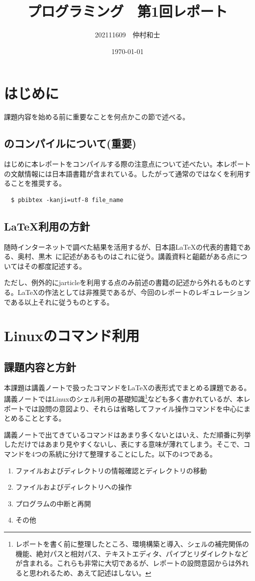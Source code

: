 \documentclass[dvipdfmx,12pt,a4j]{jarticle}
\title{プログラミング　第1回レポート}
\author{202111609　仲村和士}
\date{\today}
\begin{document}
\maketitle
\section{はじめに}
課題内容を始める前に重要なことを何点かこの節で述べる。

\subsection{\BibTeX のコンパイルについて(重要)}
はじめに本レポートをコンパイルする際の注意点について述べたい。本レポートの文献情報には日本語書籍が含まれている。したがって通常の\BibTeX ではなく\pBibTeX を利用することを推奨する。
\begin{verbatim}
  $ pbibtex -kanji=utf-8 file_name
\end{verbatim}

\subsection{\LaTeX 利用の方針}
随時インターネットで調べた結果を活用するが、日本語\LaTeX の代表的書籍である、奥村、黒木~\cite{bibunsho}に記述があるものはこれに従う。講義資料と齟齬がある点についてはその都度記述する。

ただし、例外的にjarticleを利用する点のみ前述の書籍の記述から外れるものとする。\LaTeX の作法としては非推奨であるが、今回のレポートのレギュレーションである以上それに従うものとする。

\section{Linuxのコマンド利用}
\subsection{課題内容と方針}
本課題は講義ノートで扱ったコマンドをLaTeXの表形式でまとめる課題である。講義ノートではLinuxのシェル利用の基礎知識\footnote{レポートを書く前に整理したところ、環境構築と導入、シェルの補完関係の機能、絶対パスと相対パス、テキストエディタ、パイプとリダイレクトなどが含まれる。これらも非常に大切であるが、レポートの設問意図からは外れると思われるため、あえて記述はしない。}なども多く書かれているが、本レポートでは設問の意図より、それらは省略してファイル操作コマンドを中心にまとめることとする。

講義ノートで出てきているコマンドはあまり多くないとはいえ、ただ順番に列挙しただけではあまり見やすくないし、表にする意味が薄れてしまう。そこで、コマンドを4つの系統に分けて整理することにした。以下の4つである。
\begin{enumerate}
  \item ファイルおよびディレクトリの情報確認とディレクトリの移動
  \item ファイルおよびディレクトリへの操作
  \item プログラムの中断と再開
  \item その他
\end{enumerate}
\end{document}
